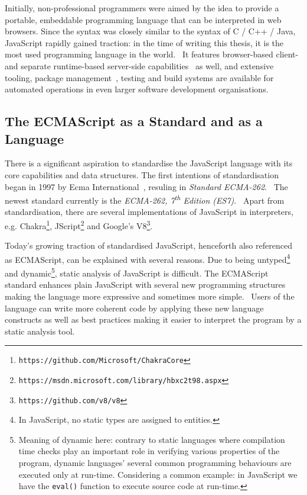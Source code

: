 Initially, non-professional programmers were aimed by the idea to provide a portable, embeddable programming language that can be interpreted in web browsers. Since the syntax was closely similar to the syntax of C / C++ / Java, JavaScript rapidly gained traction: in the time of writing this thesis, it is the most used programming language in the world.~\cite{javascriptstackoverflow} It features browser-based client- and separate runtime-based server-side capabilities~\cite{nodejs} as well, and extensive tooling, package management~\cite{npmjs}, testing and build systems are available for automated operations in even larger software development organisations.


\subsection{The ECMAScript as a Standard and as a Language}

There is a significant aspiration to standardise the JavaScript language with its core capabilities and data structures. The first intentions of standardisation began in 1997 by Ecma International~\cite{webedjavascripthistory}, resuling in \emph{Standard ECMA-262}.~\cite{ecmascriptstandardfirstversion} The newest standard currently is the \emph{ECMA-262, 7\textsuperscript{th} Edition (ES7)}.~\cite{ecmascriptstandard} Apart from standardisation, there are several implementations of JavaScript in interpreters, e.g. Chakra\footnote{\texttt{https://github.com/Microsoft/ChakraCore}}, JScript\footnote{\texttt{https://msdn.microsoft.com/library/hbxc2t98.aspx}} and Google's V8\footnote{\texttt{https://github.com/v8/v8}}.~\cite{stein-daniel-msc}

Today's growing traction of standardised JavaScript, henceforth also referenced as ECMAScript, can be explained with several reasons. Due to being untyped\footnote{In JavaScript, no static types are assigned to entities.} and dynamic\footnote{Meaning of dynamic here: contrary to static languages where compilation time checks play an important role in verifying various properties of the program, dynamic languages' several common programming behaviours are executed only at run-time. Considering a common example: in JavaScript we have the \texttt{eval()} function to execute source code at run-time.}, static analysis of JavaScript is difficult. The ECMAScript standard enhances plain JavaScript with several new programming structures making the language more expressive and sometimes more simple.~\cite{es6-features} Users of the language can write more coherent code by applying these new language constructs as well as best practices making it easier to interpret the program by a static analysis tool.


